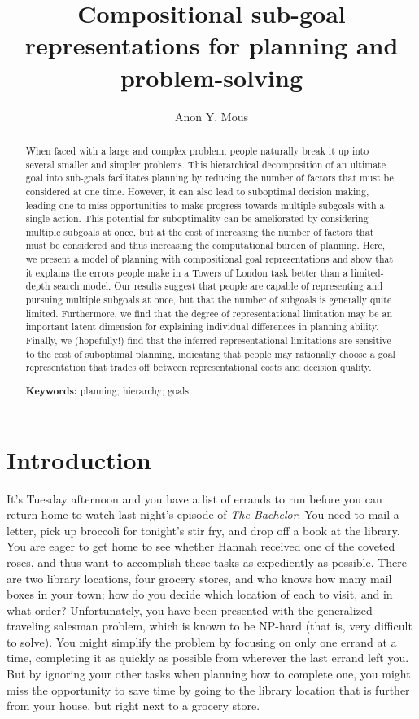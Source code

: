 \documentclass[10pt,letterpaper]{article}
\title{Compositional sub-goal representations for planning and problem-solving}
\author{Anon Y. Mous}
\begin{document}
\maketitle


\begin{abstract}
When faced with a large and complex problem, people naturally break it up into several smaller and simpler problems. This hierarchical decomposition of an ultimate goal into sub-goals facilitates planning by reducing the number of factors that must be considered at one time. However, it can also lead to suboptimal decision making, leading one to miss opportunities to make progress towards multiple subgoals with a single action. This potential for suboptimality can be ameliorated by considering multiple subgoals at once, but at the cost of increasing the number of factors that must be considered and thus increasing the computational burden of planning. Here, we present a model of planning with compositional goal representations and show that it explains the errors people make in a Towers of London task better than a limited-depth search model. Our results suggest that people are capable of representing and pursuing multiple subgoals at once, but that the number of subgoals is generally quite limited. Furthermore, we find that the degree of representational limitation may be an important latent dimension for explaining individual differences in planning ability. Finally, we (hopefully!) find that the inferred representational limitations are sensitive to the cost of suboptimal planning, indicating that people may rationally choose a goal representation that trades off between representational costs and decision quality.

\textbf{Keywords:} 
planning; hierarchy; goals
\end{abstract}


\section{Introduction}

It's Tuesday afternoon and you have a list of errands to run before you can return home to watch last night's episode of \textit{The Bachelor}. You need to mail a letter, pick up broccoli for tonight's stir fry, and drop off a book at the library. You are eager to get home to see whether Hannah received one of the coveted roses, and thus want to accomplish these tasks as expediently as possible. There are two library locations, four grocery stores, and who knows how many mail boxes in your town; how do you decide which location of each to visit, and in what order? Unfortunately, you have been presented with the generalized traveling salesman problem, which is known to be NP-hard (that is, very difficult to solve). You might simplify the problem by focusing on only one errand at a time, completing it as quickly as possible from wherever the last errand left you. But by ignoring your other tasks when planning how to complete one, you might miss the opportunity to save time by going to the library location that is further from your house, but right next to a grocery store.
\end{document}
